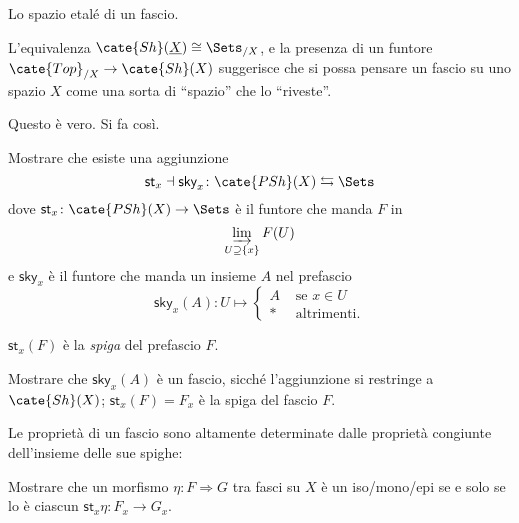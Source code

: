 Lo spazio etal\'e di un fascio.

L'equivalenza $\cate{Sh}(\underline X)\cong \Sets_{/X}$, e la presenza di un funtore $\cate{Top}_{/X}\to \cate{Sh}(X)$ suggerisce che si possa pensare un fascio su uno spazio $X$ come una sorta di ``spazio'' che lo ``riveste''.

Questo \`e vero. Si fa cos\`i.
\begin{MyExercise}
Mostrare che esiste una aggiunzione 
\[
\textsf{st}_x\dashv \textsf{sky}_x\colon \cate{PSh}(X) \leftrightarrows \Sets
\]
dove $\textsf{st}_x\colon \cate{PSh}(X)\to \Sets$ \`e il funtore che manda $F$ in
\[
\varinjlim_{U\supseteq \{x\}} F(U)
\]
e $\textsf{sky}_x$ \`e il funtore che manda un insieme $A$ nel prefascio
\[
\textsf{sky}_x(A) \colon U\mapsto
\begin{cases}
A & \text{ se } x\in U\\
* & \text{ altrimenti.}
\end{cases} 
\]
\end{MyExercise}
$\textsf{st}_x(F)$ \`e la \emph{spiga} del prefascio $F$.
\begin{MyExercise}
Mostrare che $\textsf{sky}_x(A)$ \`e un fascio, sicch\'e l'aggiunzione si restringe a $\cate{Sh}(X)$; $\textsf{st}_x(F)=F_x$ \`e la spiga del fascio $F$. 
\end{MyExercise}
Le propriet\`a di un fascio sono altamente determinate dalle propriet\`a congiunte dell'insieme delle sue spighe:
\begin{MyExercise}
Mostrare che un morfismo $\eta\colon F\Rightarrow G$ tra fasci su $X$ \`e un iso/mono/epi se e solo se lo \`e ciascun $\textsf{st}_x\eta\colon F_x\to G_x$.
\end{MyExercise}
